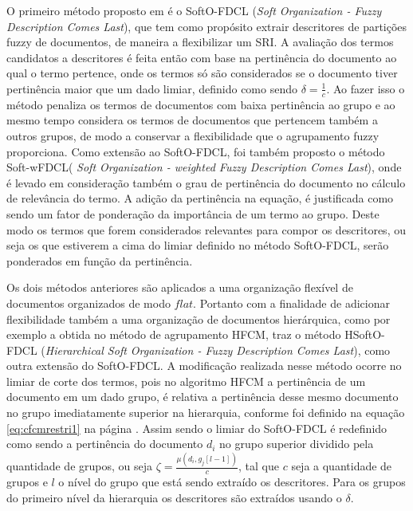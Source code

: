 O primeiro método proposto em \cite{Nogueira2013} é o SoftO-FDCL (\textit{Soft Organization - Fuzzy Description Comes
Last\/}), que tem como propósito extrair descritores de partições fuzzy de documentos, de maneira a
flexibilizar um SRI. A avaliação dos termos candidatos a descritores é feita então com base na
pertinência do documento ao qual o termo pertence, onde os termos só são considerados se o documento
tiver pertinência maior que um dado limiar, definido como sendo 
$\delta = \frac{1}{c}$. Ao fazer isso o método penaliza os termos de
documentos com baixa pertinência ao grupo e ao mesmo tempo considera os termos de documentos que
pertencem também a outros grupos, de modo a conservar a flexibilidade que o agrupamento fuzzy
proporciona. Como extensão ao SoftO-FDCL, foi também proposto o método Soft-wFDCL(\textit{ Soft
Organization - weighted Fuzzy Description Comes Last\/}), onde é levado em consideração também o
grau de pertinência do documento no cálculo de relevância do termo. A adição da pertinência na
equação, é justificada como sendo um fator de ponderação da importância de um termo ao grupo. Deste
modo os termos que forem considerados relevantes para compor os descritores, ou seja os que
estiverem a cima do limiar definido no método SoftO-FDCL, serão ponderados em função da pertinência.

Os dois métodos anteriores são aplicados a uma organização flexível de documentos organizados de
modo $flat$. Portanto com a finalidade de adicionar flexibilidade também a uma organização de
documentos hierárquica, como por exemplo a obtida no método de
agrupamento HFCM, \cite{Nogueira2013} traz o método HSoftO-FDCL (\textit{Hierarchical Soft
Organization - Fuzzy Description Comes Last\/}), como outra extensão do SoftO-FDCL. 
A modificação realizada nesse método ocorre no limiar de corte dos termos, pois no algoritmo HFCM a
pertinência de um documento em um dado grupo, é relativa a pertinência desse mesmo documento no
grupo imediatamente superior na hierarquia, conforme foi definido na equação \ref{eq:cfcmrestri1} na
página \pageref{eq:cfcmrestri1}. Assim sendo o limiar do SoftO-FDCL é redefinido como
sendo a pertinência do documento $d_i$ no grupo superior dividido pela quantidade de grupos, ou seja
$\zeta = \frac{\mu(d_i,g_j[l-1])}{c}$, tal que $c$ seja a quantidade de grupos e $l$ o nível do
grupo que está sendo extraído os descritores. Para os grupos do primeiro nível da hierarquia os
descritores são extraídos usando o $\delta$. 


